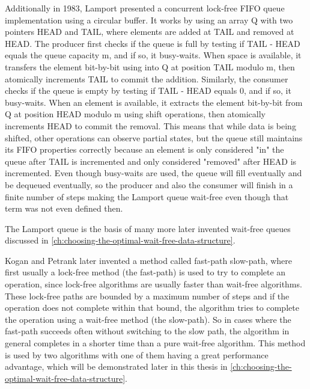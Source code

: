 Additionally in 1983, Lamport presented a concurrent lock-free \ac{FIFO} queue implementation using a circular buffer. It works by using an array Q with two pointers HEAD and TAIL, where elements are added at TAIL and removed at HEAD. The producer first checks if the queue is full by testing if TAIL - HEAD equals the queue capacity m, and if so, it busy-waits. When space is available, it transfers the element bit-by-bit using into Q at position TAIL modulo m, then atomically increments TAIL to commit the addition. Similarly, the consumer checks if the queue is empty by testing if TAIL - HEAD equals 0, and if so, it busy-waits. When an element is available, it extracts the element bit-by-bit from Q at position HEAD modulo m using shift operations, then atomically increments HEAD to commit the removal. This means that while data is being shifted, other operations can observe partial states, but the queue still maintains its \ac{FIFO} properties correctly because an element is only considered "in" the queue after TAIL is incremented and only considered "removed" after HEAD is incremented. Even though busy-waits are used, the queue will fill eventually and be dequeued eventually, so the producer and also the consumer will finish in a finite number of steps making the Lamport queue wait-free even though that term was not even defined then. \cite{Lamport1983SPSCCircularBuffer} 

The Lamport queue is the basis of many more later invented wait-free queues discussed in \cref{ch:choosing-the-optimal-wait-free-data-structure}.

Kogan and Petrank later invented a method called fast-path slow-path, where first usually a lock-free method (the fast-path) is used to try to complete an operation, since lock-free algorithms are usually faster than wait-free algorithms. These lock-free paths are bounded by a maximum number of steps and if the operation does not complete within that bound, the algorithm tries to complete the operation using a wait-free method (the slow-path). So in cases where the fast-path succeeds often without switching to the slow path, the algorithm in general completes in a shorter time than a pure wait-free algorithm. This method is used by two algorithms with one of them having a great performance advantage, which will be demonstrated later in this thesis in \cref{ch:choosing-the-optimal-wait-free-data-structure}. \cite{kogan2012methodology}
